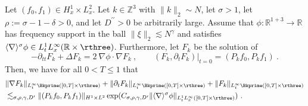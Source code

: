 \documentclass[11pt]{article}
\begin{document}
\begin{prop} \label{lin:prop_freq_envelope}
Let \( (f_0,f_1) \in H_x^1 \times L_x^2 \). Let \( k \in \mathbb{Z}^3 \) with \( \| k \|_2 \sim N \), let \( \sigma > 1 \), let \( \rho:= \sigma-1-\delta >0 \), and let \( D^{\prime\prime} >0 \) be  arbitrarily large. Assume that \( \phi \colon \mathbb{R}^{1+3} \rightarrow \mathbb{R} \) has frequency support in the ball \( \| \xi \|_2 \lesssim N^\gamma \) and satisfies \( \langle \nabla \rangle^\sigma \phi \in L_t^1 L_x^\infty(\mathbb{R}\times \rthree)\). Furthermore, let \( F_k \) be the solution of 
\begin{equation}\label{lin:eq_Fk}
-\partial_{tt} F_k + \Delta F_k = 2 ~ \nabla \phi \cdot \nabla F_k~, \qquad (F_k,\partial_t F_k )|_{t=0}= ( P_k f_0,P_k f_1) ~. 
\end{equation}
Then, we have for all \( 0< T \leq 1 \) that 
\begin{align*}
&\| \nabla F_k \|_{L_t^\infty \Bkprime ([0,T]\times \rthree)}+ \| \partial_t F_k \|_{L_t^\infty \Bkprime ([0,T]\times \rthree)}+  \| F_k \|_{L_t^\infty \Bkprime ([0,T]\times \rthree)}\\
& \lesssim_{\sigma,\rho,\gamma,D^\prime} \| (P_k f_0 , P_k f_1) \|_{H^1\times L^2} \exp( C_{\sigma,\rho,\gamma,D^\prime} \| \langle \nabla \rangle^{\sigma}  \phi \|_{L_t^1 L_x^\infty([0,T]\times \rthree)} )~. 
\end{align*}
\end{prop}
\end{document}
